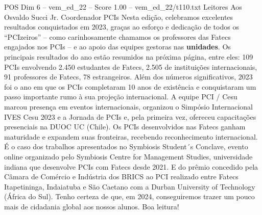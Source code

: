 \begin{textsample}{POS Dim 6 – vem\_ed\_22 – Score 1.00 – vem\_ed\_22/t110.txt}  \label{ex:f6_pos_049}
Leitores Aos Osvaldo Succi Jr.
Coordenador PCIs Nesta edição, celebramos excelentes resultados conquistados em 2023, graças ao esforço e dedicação de todos os “PCIzeiros” – como carinhosamente chamamos os professores das Fatecs engajados nos PCIs – e ao apoio das equipes gestoras nas \textbf{unidades}.
Os principais resultados do ano estão resumidos na próxima página, entre eles: 109 PCIs envolvendo 2.450 estudantes de Fatecs, 2.505 de instituições internacionais, 91 professores de Fatecs, 78 estrangeiros.
Além dos números significativos, 2023 foi o ano em que os PCIs completaram 10 anos de existência e conquistaram um passo importante rumo à sua projeção internacional.
A equipe PCI / Cesu marcou presença em eventos internacionais, organizou o Simpósio Internacional IVES Cesu 2023 e a Jornada de PCIs e, pela primeira vez, ofereceu capacitações presenciais na DUOC UC (Chile).
Os PCIs desenvolvidos nas Fatecs ganham maturidade e expandem suas fronteiras, recebendo reconhecimento internacional.
É o caso dos trabalhos apresentados no Symbiosis Student´s Conclave, evento online organizado pelo Symbiosis Centre for Management Studies, universidade indiana que desenvolve PCIs com Fatecs desde 2021.
E do prêmio concedido pela Câmara de Comércio e Indústria dos BRICS ao PCI realizado entre Fatecs Itapetininga, Indaiatuba e São Caetano com a Durban University of Technology (África do Sul).
Tenho certeza de que, em 2024, conseguiremos trazer um pouco mais de cidadania global aos nossos alunos.
Boa leitura!

\end{textsample}
